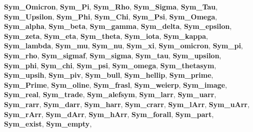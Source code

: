 \begin{DoxyCompactItemize}
{\bfseries Sym\+\_\+\+Omicron}, 
{\bfseries Sym\+\_\+\+Pi}, 
{\bfseries Sym\+\_\+\+Rho}, 
{\bfseries Sym\+\_\+\+Sigma}, 
\newline
{\bfseries Sym\+\_\+\+Tau}, 
{\bfseries Sym\+\_\+\+Upsilon}, 
{\bfseries Sym\+\_\+\+Phi}, 
{\bfseries Sym\+\_\+\+Chi}, 
\newline
{\bfseries Sym\+\_\+\+Psi}, 
{\bfseries Sym\+\_\+\+Omega}, 
{\bfseries Sym\+\_\+alpha}, 
{\bfseries Sym\+\_\+beta}, 
\newline
{\bfseries Sym\+\_\+gamma}, 
{\bfseries Sym\+\_\+delta}, 
{\bfseries Sym\+\_\+epsilon}, 
{\bfseries Sym\+\_\+zeta}, 
\newline
{\bfseries Sym\+\_\+eta}, 
{\bfseries Sym\+\_\+theta}, 
{\bfseries Sym\+\_\+iota}, 
{\bfseries Sym\+\_\+kappa}, 
\newline
{\bfseries Sym\+\_\+lambda}, 
{\bfseries Sym\+\_\+mu}, 
{\bfseries Sym\+\_\+nu}, 
{\bfseries Sym\+\_\+xi}, 
\newline
{\bfseries Sym\+\_\+omicron}, 
{\bfseries Sym\+\_\+pi}, 
{\bfseries Sym\+\_\+rho}, 
{\bfseries Sym\+\_\+sigmaf}, 
\newline
{\bfseries Sym\+\_\+sigma}, 
{\bfseries Sym\+\_\+tau}, 
{\bfseries Sym\+\_\+upsilon}, 
{\bfseries Sym\+\_\+phi}, 
\newline
{\bfseries Sym\+\_\+chi}, 
{\bfseries Sym\+\_\+psi}, 
{\bfseries Sym\+\_\+omega}, 
{\bfseries Sym\+\_\+thetasym}, 
\newline
{\bfseries Sym\+\_\+upsih}, 
{\bfseries Sym\+\_\+piv}, 
{\bfseries Sym\+\_\+bull}, 
{\bfseries Sym\+\_\+hellip}, 
\newline
{\bfseries Sym\+\_\+prime}, 
{\bfseries Sym\+\_\+\+Prime}, 
{\bfseries Sym\+\_\+oline}, 
{\bfseries Sym\+\_\+frasl}, 
\newline
{\bfseries Sym\+\_\+weierp}, 
{\bfseries Sym\+\_\+image}, 
{\bfseries Sym\+\_\+real}, 
{\bfseries Sym\+\_\+trade}, 
\newline
{\bfseries Sym\+\_\+alefsym}, 
{\bfseries Sym\+\_\+larr}, 
{\bfseries Sym\+\_\+uarr}, 
{\bfseries Sym\+\_\+rarr}, 
\newline
{\bfseries Sym\+\_\+darr}, 
{\bfseries Sym\+\_\+harr}, 
{\bfseries Sym\+\_\+crarr}, 
{\bfseries Sym\+\_\+l\+Arr}, 
\newline
{\bfseries Sym\+\_\+u\+Arr}, 
{\bfseries Sym\+\_\+r\+Arr}, 
{\bfseries Sym\+\_\+d\+Arr}, 
{\bfseries Sym\+\_\+h\+Arr}, 
\newline
{\bfseries Sym\+\_\+forall}, 
{\bfseries Sym\+\_\+part}, 
{\bfseries Sym\+\_\+exist}, 
{\bfseries Sym\+\_\+empty}, 
\newline

\end{DoxyCompactItemize}
